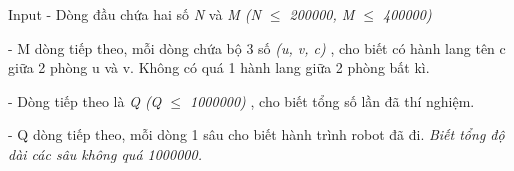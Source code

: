 Input
- Dòng đầu chứa hai số \emph{ N } và \emph{ M (N  $\le$  200000, M  $\le$  400000) }

- M dòng tiếp theo, mỗi dòng chứa bộ 3 số \emph{ (u, v, c) } , cho biết có hành lang tên c giữa 2 phòng u và v. Không có quá 1 hành lang giữa 2 phòng bất kì.

- Dòng tiếp theo là \emph{ Q (Q  $\le$  1000000) } , cho biết tổng số lần đã thí nghiệm.

- Q dòng tiếp theo, mỗi dòng 1 sâu cho biết hành trình robot đã đi. \emph{ Biết tổng độ dài các sâu không quá 1000000. }